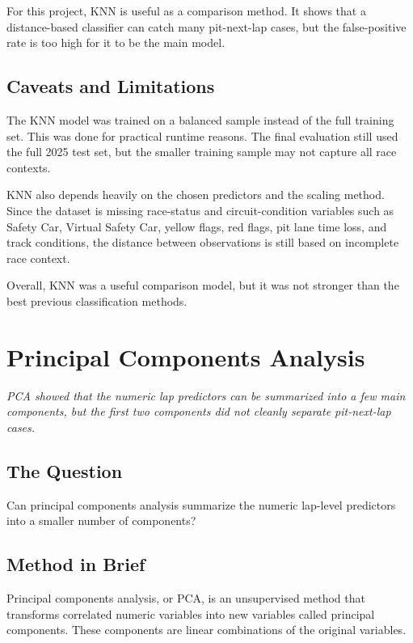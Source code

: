 \documentclass[11pt,oneside,openany]{book}
\newcommand{\chapterquote}[1]{%
\begin{center}
\small\textit{#1}
\end{center}
\vspace{-0.5em}
}
\begin{document}
For this project, KNN is useful as a comparison method. It shows that a distance-based classifier can catch many pit-next-lap cases, but the false-positive rate is too high for it to be the main model.

\section{Caveats and Limitations}

The KNN model was trained on a balanced sample instead of the full training set. This was done for practical runtime reasons. The final evaluation still used the full 2025 test set, but the smaller training sample may not capture all race contexts.

KNN also depends heavily on the chosen predictors and the scaling method. Since the dataset is missing race-status and circuit-condition variables such as Safety Car, Virtual Safety Car, yellow flags, red flags, pit lane time loss, and track conditions, the distance between observations is still based on incomplete race context.

Overall, KNN was a useful comparison model, but it was not stronger than the best previous classification methods.


\chapter{Principal Components Analysis}
\chapterquote{PCA showed that the numeric lap predictors can be summarized into a few main components, but the first two components did not cleanly separate pit-next-lap cases.}

\section{The Question}

Can principal components analysis summarize the numeric lap-level predictors into a smaller number of components?

\section{Method in Brief}

Principal components analysis, or PCA, is an unsupervised method that transforms correlated numeric variables into new variables called principal components. These components are linear combinations of the original variables.
\end{document}
